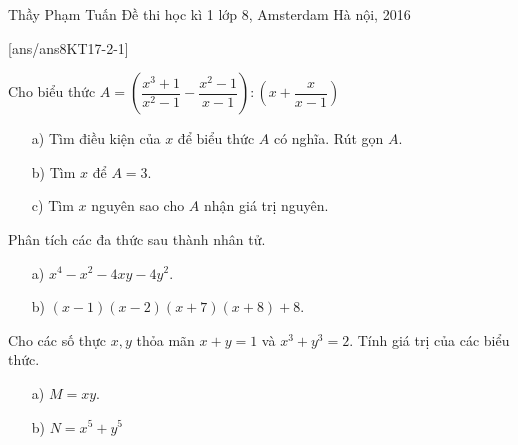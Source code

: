 \begin{name}
{Thầy  Phạm Tuấn}
{Đề thi học kì 1 lớp 8, Amsterdam Hà nội, 2016}
\end{name}
\setcounter{ex}{0}
[ans/ans8KT17-2-1]
\begin{ex}%
Cho biểu thức $A= \left ( \dfrac{x^3+1}{x^2-1} -\dfrac{x^2-1}{x-1} \right ) : \left ( x+\dfrac{x}{x-1}\right )$
\begin{enumerate}
\item[a)] Tìm điều kiện của $x$ để biểu thức $A$ có nghĩa. Rút gọn $A$. 
\item[b)] Tìm $x$ để $A=3$. 
\item[c)]  Tìm $x$ nguyên sao cho $A$ nhận giá trị nguyên.
\end{enumerate}
\end{ex}

\begin{ex}%
Phân tích các đa thức sau thành nhân tử.
\begin{enumerate}
\item[a)] $x^4-x^2-4xy-4y^2$.
\item[b)] $(x-1)(x-2)(x+7)(x+8) +8 $.
\end{enumerate}
\end{ex}

\begin{ex}%
    Cho các số thực $x,y$ thỏa mãn $x+y=1$ và $x^3+y^3=2$. Tính giá trị của các biểu thức.
\begin{enumerate}
\item[a)] $M=xy$.
\item[b)] $N=x^5+y^5$
\end{enumerate}
\end{ex}

